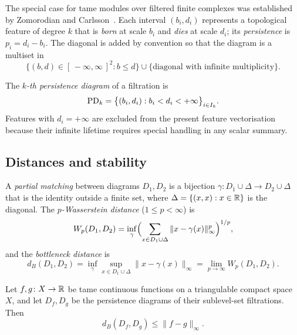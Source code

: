The special case for tame modules over filtered finite complexes was established by Zomorodian and Carlsson~\parencite{edelsbrunner2002topological}. Each interval $(b_i,d_i)$ represents a topological feature of degree $k$ that is \emph{born} at scale $b_i$ and \emph{dies} at scale $d_i$; its \emph{persistence} is $p_i=d_i-b_i$. The diagonal is added by convention so that the diagram is a multiset in
\[
  \{(b,d)\in[\,-\infty,\infty\,]^2:b\leq d\}\cup\{\text{diagonal with infinite multiplicity}\}.
\]

\begin{definition}
\label{def:pd}
The \emph{$k$-th persistence diagram} of a filtration is
\begin{equation}
  \mathrm{PD}_k=\bigl\{(b_i,d_i):b_i<d_i<+\infty\bigr\}_{i\in I_k}.
  \label{eq:pd}
\end{equation}
Features with $d_i=+\infty$ are excluded from the present feature vectorisation because their infinite lifetime requires special handling in any scalar summary.
\end{definition}

\subsection{Distances and stability}
\label{subsubsec:pd-distances}

\begin{definition}
\label{def:bottleneck}
A \emph{partial matching} between diagrams $D_1,D_2$ is a bijection $\gamma\colon D_1\cup\Delta\to D_2\cup\Delta$ that is the identity outside a finite set, where $\Delta=\{(x,x):x\in\mathbb{R}\}$ is the diagonal. The \emph{$p$-Wasserstein distance} ($1\leq p<\infty$) is
\[
  W_p(D_1,D_2)=\inf_\gamma\Bigl(\sum_{x\in D_1\cup\Delta}\|x-\gamma(x)\|_\infty^p\Bigr)^{1/p},
\]
and the \emph{bottleneck distance} is
\[
  d_B(D_1,D_2)=\inf_\gamma\sup_{x\in D_1\cup\Delta}\|x-\gamma(x)\|_\infty=\lim_{p\to\infty}W_p(D_1,D_2).
\]
\end{definition}

\begin{theorem}
\label{thm:stability}
Let $f,g\colon X\to\mathbb{R}$ be tame continuous functions on a triangulable compact space $X$, and let $D_f,D_g$ be the persistence diagrams of their sublevel-set filtrations. Then
\[
  d_B(D_f,D_g)\leq\|f-g\|_\infty.
\]
\end{theorem}

